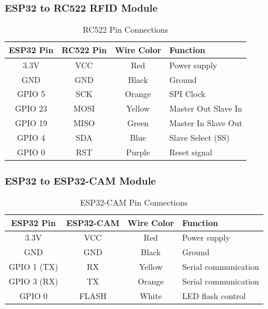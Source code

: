 \documentclass[12pt,a4paper]{article}
\begin{document}
\subsubsection{ESP32 to RC522 RFID Module}

\begin{table}[htbp]
	\centering
	\caption{RC522 Pin Connections}
	\label{tab:rc522_pins}
	\begin{tabular}{|c|c|c|l|}
		\hline
		\textbf{ESP32 Pin} & \textbf{RC522 Pin} & \textbf{Wire Color} & \textbf{Function}   \\
		\hline
		3.3V               & VCC                & Red                 & Power supply        \\
		GND                & GND                & Black               & Ground              \\
		GPIO 5             & SCK                & Orange              & SPI Clock           \\
		GPIO 23            & MOSI               & Yellow              & Master Out Slave In \\
		GPIO 19            & MISO               & Green               & Master In Slave Out \\
		GPIO 4             & SDA                & Blue                & Slave Select (SS)   \\
		GPIO 0             & RST                & Purple              & Reset signal        \\
		\hline
	\end{tabular}
\end{table}

\subsubsection{ESP32 to ESP32-CAM Module}

\begin{table}[htbp]
	\centering
	\caption{ESP32-CAM Pin Connections}
	\label{tab:camera_pins}
	\begin{tabular}{|c|c|c|l|}
		\hline
		\textbf{ESP32 Pin} & \textbf{ESP32-CAM} & \textbf{Wire Color} & \textbf{Function}    \\
		\hline
		3.3V               & VCC                & Red                 & Power supply         \\
		GND                & GND                & Black               & Ground               \\
		GPIO 1 (TX)        & RX                 & Yellow              & Serial communication \\
		GPIO 3 (RX)        & TX                 & Orange              & Serial communication \\
		GPIO 0             & FLASH              & White               & LED flash control    \\
		\hline
	\end{tabular}
\end{table}
\end{document}
